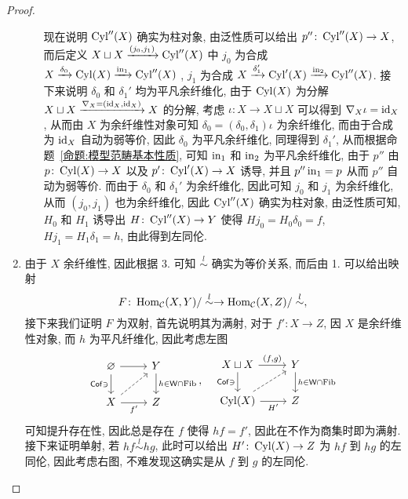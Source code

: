 \begin{proof}
\begin{enumerate}
\begin{enumerate}
            现在说明 $\operatorname{Cyl}''(X)$ 确实为柱对象, 由泛性质可以给出 $p'' \colon \operatorname{Cyl}''(X) \to X$, 而后定义 $X\sqcup X \xrightarrow{(j_0,j_1)} \operatorname{Cyl}''(X)$ 中 $j_0$ 为合成 $X \xrightarrow{\delta_0} \operatorname{Cyl}(X) \xrightarrow{\operatorname{in}_1} \operatorname{Cyl}''(X)$ , $j_1$ 为合成 $X \xrightarrow{\delta_1'}\operatorname{Cyl}'(X) \xrightarrow{\operatorname{in}_2} \operatorname{Cyl}''(X)$. 接下来说明 $\delta_0$ 和 $\delta_1'$ 均为平凡余纤维化, 由于 $\operatorname{Cyl}(X)$ 为分解 $X\sqcup X \xrightarrow{\nabla_X = (\mathrm{id}_X,\mathrm{id}_X)}X$ 的分解, 考虑 $\iota \colon X \to X\sqcup X$ 可以得到 $\nabla_X \iota  = \mathrm{id}_X$, 从而由 $X$ 为余纤维性对象可知 $\delta_0 =  (\delta_0,\delta_1)\iota$ 为余纤维化, 而由于合成为 $\mathrm{id}_X$ 自动为弱等价, 因此 $\delta_0$ 为平凡余纤维化, 同理得到 $\delta_1'$, 从而根据命题~\ref{命题:模型范畴基本性质}, 可知 $\operatorname{in}_1$ 和 $\operatorname{in}_2$ 为平凡余纤维化, 由于 $p''$ 由 $p\colon \operatorname{Cyl}(X) \to X$ 以及 $p' \colon \operatorname{Cyl}'(X) \to X$ 诱导, 并且 $p'' \operatorname{in}_1 = p$ 从而 $p''$ 自动为弱等价. 而由于 $\delta_0$ 和 $\delta_1'$ 为余纤维化, 因此可知 $j_0$ 和 $j_1$ 为余纤维化, 从而 $(j_0,j_1)$ 也为余纤维化, 因此 $\operatorname{Cyl}''(X)$ 确实为柱对象, 由泛性质可知, $H_0$ 和 $H_1$ 诱导出 $H \colon \operatorname{Cyl}''(X) \to Y$ 使得  $H j_0 = H_0 \delta_0 = f$, $H j_1 = H_1 \delta_1 = h$, 由此得到左同伦.
        \end{enumerate}
        \item 由于 $X$ 余纤维性, 因此根据 3. 可知 $\overset{l}{\sim}$ 确实为等价关系, 而后由 1. 可以给出映射
        \[
        F \colon \operatorname{Hom}_{\cal{C}}(X,Y)/\overset{l}{\sim} \to \operatorname{Hom}_{\cal{C}}(X,Z)/\overset{l}{\sim} ,
        \]
        接下来我们证明 $F$ 为双射, 首先说明其为满射, 对于 $f' \colon X \to Z$, 因 $X$ 是余纤维性对象, 而 $h$ 为平凡纤维化, 因此考虑左图
        \[\begin{tikzcd}
	\varnothing & Y \\
	X & Z
	\arrow[from=1-1, to=1-2]
	\arrow["{\Cof\ni}"', from=1-1, to=2-1]
	\arrow["{h\in \cate{W}\cap\Fib}", from=1-2, to=2-2]
	\arrow[dashed, from=2-1, to=1-2]
	\arrow["{{f'}}"', from=2-1, to=2-2]
        \end{tikzcd}, \quad \begin{tikzcd}
	{X\sqcup X} & Y \\
	{\Cyl(X)} & Z
	\arrow["{(f,g)}", from=1-1, to=1-2]
	\arrow["{\Cof\ni}"', from=1-1, to=2-1]
	\arrow["{h\in \cate{W}\cap \Fib}", from=1-2, to=2-2]
	\arrow[dashed, from=2-1, to=1-2]
	\arrow["{H'}"', from=2-1, to=2-2]
        \end{tikzcd}\]
        可知提升存在性, 因此总是存在 $f$ 使得 $hf = f'$, 因此在不作为商集时即为满射. 接下来证明单射, 若 $hf \overset{l}{\sim} hg$, 此时可以给出 $H' \colon \operatorname{Cyl}(X) \to Z$ 为 $hf$ 到 $hg$ 的左同伦, 因此考虑右图, 不难发现这确实是从 $f$ 到 $g$ 的左同伦.

\end{enumerate}
\end{proof}
